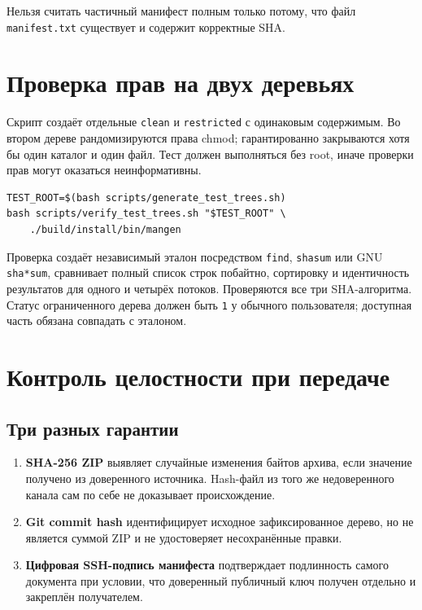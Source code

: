\documentclass[12pt,a4paper]{article}
\begin{document}
Нельзя считать частичный манифест полным только потому, что файл
\texttt{manifest.txt} существует и содержит корректные SHA.

\section{Проверка прав на двух деревьях}

Скрипт создаёт отдельные \texttt{clean} и \texttt{restricted} с одинаковым
содержимым. Во втором дереве рандомизируются права chmod; гарантированно
закрываются хотя бы один каталог и один файл. Тест должен выполняться без
root, иначе проверки прав могут оказаться неинформативны.

\begin{lstlisting}
TEST_ROOT=$(bash scripts/generate_test_trees.sh)
bash scripts/verify_test_trees.sh "$TEST_ROOT" \
    ./build/install/bin/mangen
\end{lstlisting}

Проверка создаёт независимый эталон посредством \texttt{find},
\texttt{shasum} или GNU \texttt{sha*sum}, сравнивает полный список строк
побайтно, сортировку и идентичность результатов для одного и четырёх
потоков. Проверяются все три SHA-алгоритма. Статус ограниченного дерева
должен быть \texttt{1} у обычного пользователя; доступная часть
обязана совпадать с эталоном.

\section{Контроль целостности при передаче}

\subsection{Три разных гарантии}

\begin{enumerate}
\item \textbf{SHA-256 ZIP} выявляет случайные изменения байтов архива,
если значение получено из доверенного источника. Hash-файл из того же
недоверенного канала сам по себе не доказывает происхождение.
\item \textbf{Git commit hash} идентифицирует исходное зафиксированное
дерево, но не является суммой ZIP и не удостоверяет несохранённые правки.
\item \textbf{Цифровая SSH-подпись манифеста} подтверждает подлинность
самого документа при условии, что доверенный публичный ключ получен
отдельно и закреплён получателем.
\end{enumerate}
\end{document}
